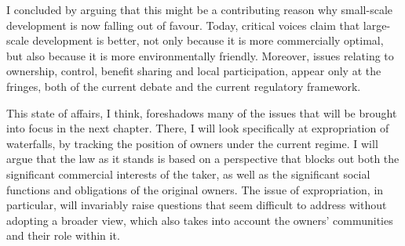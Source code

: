 {I concluded by arguing that this might be a contributing reason why small-scale development is now falling out of favour. Today, critical voices claim that large-scale development is better, not only because it is more commercially optimal, but also because it is more environmentally friendly. Moreover, issues relating to ownership, control, benefit sharing and local participation, appear only at the fringes, both of the current debate and the current regulatory framework.

This state of affairs, I think, foreshadows many of the issues that will be brought into focus in the next chapter. There, I will look specifically at expropriation of waterfalls, by tracking the position of owners under the current regime. I will argue that the law as it stands is based on a perspective that blocks out both the significant commercial interests of the taker, as well as the significant social functions and obligations of the original owners. The issue of expropriation, in particular, will invariably raise questions that seem difficult to address without adopting a broader view, which also takes into account the owners' communities and their role within it. }